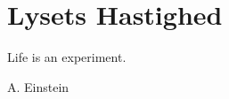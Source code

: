 \chapter{Lysets Hastighed}
\label{sec:LysetsHastighed}
\epigraph{Life is an experiment.}{A. Einstein}
\minitoc
\clearpage

\lipsum